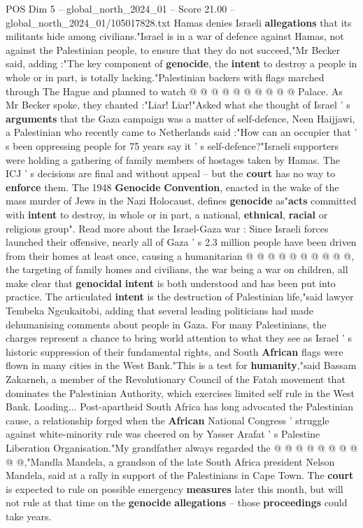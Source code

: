 \begin{textsample}{POS Dim 5 – global\_north\_2024\_01 – Score 21.00 – global\_north\_2024\_01/105017828.txt}
Hamas denies Israeli \textbf{allegations} that its militants hide among civilians."Israel is in a war of defence against Hamas, not against the Palestinian people, to ensure that they do not succeed,"Mr Becker said, adding :"The key component of \textbf{genocide}, the \textbf{intent} to destroy a people in whole or in part, is totally lacking."Palestinian backers with flags marched through The Hague and planned to watch @ @ @ @ @ @ @ @ @ @ Palace.
As Mr Becker spoke, they chanted :"Liar!
Liar!"Asked what she thought of Israel ' s \textbf{arguments} that the Gaza campaign was a matter of self-defence, Neen Haijjawi, a Palestinian who recently came to Netherlands said :"How can an occupier that ' s been oppressing people for 75 years say it ' s self-defence?"Israeli supporters were holding a gathering of family members of hostages taken by Hamas.
The ICJ ' s decisions are final and without appeal -- but the \textbf{court} has no way to \textbf{enforce} them.
The 1948 \textbf{Genocide} \textbf{Convention}, enacted in the wake of the mass murder of Jews in the Nazi Holocaust, defines \textbf{genocide} as"\textbf{acts} committed with \textbf{intent} to destroy, in whole or in part, a national, \textbf{ethnical}, \textbf{racial} or religious group".
Read more about the Israel-Gaza war : Since Israeli forces launched their offensive, nearly all of Gaza ' s 2.3 million people have been driven from their homes at least once, causing a humanitarian @ @ @ @ @ @ @ @ @ @, the targeting of family homes and civilians, the war being a war on children, all make clear that \textbf{genocidal} \textbf{intent} is both understood and has been put into practice.
The articulated \textbf{intent} is the destruction of Palestinian life,"said lawyer Tembeka Ngcukaitobi, adding that several leading politicians had made dehumanising comments about people in Gaza.
For many Palestinians, the charges represent a chance to bring world attention to what they see as Israel ' s historic suppression of their fundamental rights, and South \textbf{African} flags were flown in many cities in the West Bank."This is a test for \textbf{humanity},"said Bassam Zakarneh, a member of the Revolutionary Council of the Fatah movement that dominates the Palestinian Authority, which exercises limited self rule in the West Bank.
Loading...
Post-apartheid South Africa has long advocated the Palestinian cause, a relationship forged when the \textbf{African} National Congress ' struggle against white-minority rule was cheered on by Yasser Arafat ' s Palestine Liberation Organisation."My grandfather always regarded the @ @ @ @ @ @ @ @ @ @,"Mandla Mandela, a grandson of the late South Africa president Nelson Mandela, said at a rally in support of the Palestinians in Cape Town.
The \textbf{court} is expected to rule on possible emergency \textbf{measures} later this month, but will not rule at that time on the \textbf{genocide} \textbf{allegations} -- those \textbf{proceedings} could take years.

\end{textsample}
